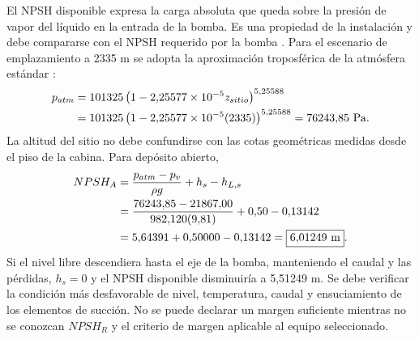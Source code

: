 El NPSH disponible expresa la carga absoluta que queda sobre la presión
de vapor del líquido en la entrada de la bomba. Es una propiedad de la
instalación y debe compararse con el NPSH requerido por la bomba
\cite{white2016}. Para el escenario de emplazamiento a 2335 m se adopta
la aproximación troposférica de la atmósfera estándar \cite{white2016}:
\begin{align}
 p_{atm}&=101325\left(1-2{,}25577\times10^{-5}z_{sitio}\right)^{5{,}25588}\notag\\
 &=101325\left(1-2{,}25577\times10^{-5}(2335)\right)^{5{,}25588}
 =76243{,}85\ \mathrm{Pa}.
\end{align}
La altitud del sitio no debe confundirse con las cotas geométricas medidas
desde el piso de la cabina. Para depósito abierto,
\begin{align}
 NPSH_A&=\frac{p_{atm}-p_v}{\rho g}+h_s-h_{L,s}\notag\\
 &=\frac{76243{,}85-21867{,}00}{982{,}120(9{,}81)}
 +0{,}50-0{,}13142\notag\\
 &=5{,}64391+0{,}50000-0{,}13142
 =\boxed{6{,}01249\ \mathrm{m}}.
 \label{eq:man-asp-npsh}
\end{align}
Si el nivel libre descendiera hasta el eje de la bomba, manteniendo
el caudal y las pérdidas, $h_s=0$ y el NPSH disponible disminuiría a
5,51249 m. Se debe verificar la condición más desfavorable de nivel,
temperatura, caudal y ensuciamiento de los elementos de succión.
No se puede declarar un margen suficiente mientras no se conozcan
$NPSH_R$ y el criterio de margen aplicable al equipo seleccionado.